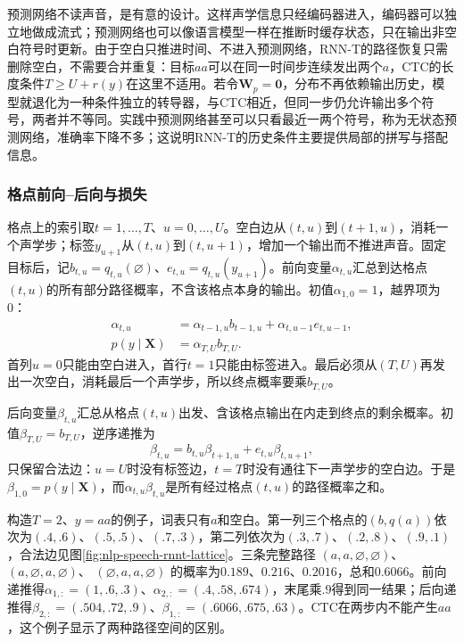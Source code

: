 预测网络不读声音，是有意的设计。这样声学信息只经编码器进入，编码器可以独立地做成流式；预测网络也可以像语言模型一样在推断时缓存状态，只在输出非空白符号时更新。由于空白只推进时间、不进入预测网络，RNN-T的路径恢复只需删除空白，不需要合并重复：目标$aa$可以在同一时间步连续发出两个$a$，CTC的长度条件$T\geq U+r(y)$在这里不适用。若令$\bm{W}_p=\bm{0}$，分布不再依赖输出历史，模型就退化为一种条件独立的转导器，与CTC相近，但同一步仍允许输出多个符号，两者并不等同。实践中预测网络甚至可以只看最近一两个符号，称为无状态预测网络，准确率下降不多；这说明RNN-T的历史条件主要提供局部的拼写与搭配信息。

\subsubsection{格点前向--后向与损失}
\label{sec:nlp-speech-rnnt-loss}

格点上的索引取$t=1,\ldots,T$、$u=0,\ldots,U$。空白边从$(t,u)$到$(t+1,u)$，消耗一个声学步；标签$y_{u+1}$从$(t,u)$到$(t,u+1)$，增加一个输出而不推进声音。固定目标后，记$b_{t,u}=q_{t,u}(\varnothing)$、$e_{t,u}=q_{t,u}(y_{u+1})$。前向变量$\alpha_{t,u}$汇总到达格点$(t,u)$的所有部分路径概率，不含该格点本身的输出。初值$\alpha_{1,0}=1$，越界项为0：
\begin{equation}
\begin{aligned}
 \alpha_{t,u}
 &=\alpha_{t-1,u}b_{t-1,u}
   +\alpha_{t,u-1}e_{t,u-1},\\
 p(y\mid\bm{X})&=\alpha_{T,U}b_{T,U}.
\end{aligned}
\label{eq:nlp-speech-rnnt-forward}
\end{equation}
首列$u=0$只能由空白进入，首行$t=1$只能由标签进入。最后必须从$(T,U)$再发出一次空白，消耗最后一个声学步，所以终点概率要乘$b_{T,U}$。

后向变量$\beta_{t,u}$汇总从格点$(t,u)$出发、含该格点输出在内走到终点的剩余概率。初值$\beta_{T,U}=b_{T,U}$，逆序递推为
\begin{equation}
 \beta_{t,u}=b_{t,u}\beta_{t+1,u}
       +e_{t,u}\beta_{t,u+1},
 \label{eq:nlp-speech-rnnt-backward}
\end{equation}
只保留合法边：$u=U$时没有标签边，$t=T$时没有通往下一声学步的空白边。于是$\beta_{1,0}=p(y\mid\bm{X})$，而$\alpha_{t,u}\beta_{t,u}$是所有经过格点$(t,u)$的路径概率之和。

构造$T=2$、$y=aa$的例子，词表只有$a$和空白。第一列三个格点的$(b,q(a))$依次为$(.4,.6)$、$(.5,.5)$、$(.7,.3)$，第二列依次为$(.3,.7)$、$(.2,.8)$、$(.9,.1)$，合法边见图\ref{fig:nlp-speech-rnnt-lattice}。三条完整路径
$(a,a,\varnothing,\varnothing)$、
$(a,\varnothing,a,\varnothing)$、
$(\varnothing,a,a,\varnothing)$
的概率为$0.189$、$0.216$、$0.2016$，总和$0.6066$。前向递推得$\alpha_{1,:}=(1,.6,.3)$、$\alpha_{2,:}=(.4,.58,.674)$，末尾乘$.9$得到同一结果；后向递推得$\beta_{2,:}=(.504,.72,.9)$、$\beta_{1,:}=(.6066,.675,.63)$。CTC在两步内不能产生$aa$，这个例子显示了两种路径空间的区别。

